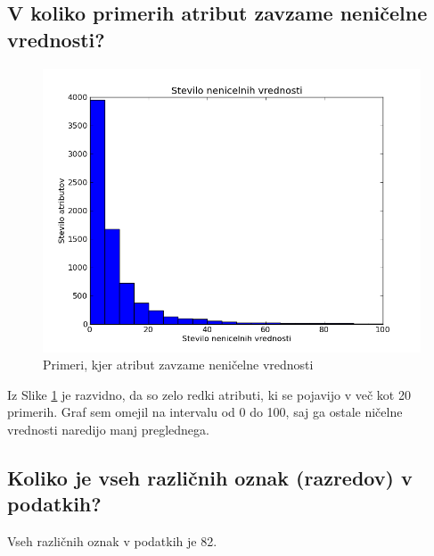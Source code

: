 \documentclass[a4paper,11pt]{article}
\begin{document}
\subsection*{V koliko primerih atribut zavzame neničelne vrednosti?}
\begin{figure}[H]
\begin{center}
\includegraphics[scale=0.5]{attributes.png}
\caption{Primeri, kjer atribut zavzame neničelne vrednosti}
\label{atributi}
\end{center}
\end{figure}
Iz Slike \ref{atributi} je razvidno, da so zelo redki atributi, ki se pojavijo v več kot 20 primerih. Graf sem omejil na intervalu od 0 do 100, saj ga ostale ničelne vrednosti naredijo manj preglednega.

\subsection*{Koliko je vseh različnih oznak (razredov) v podatkih?}
Vseh različnih oznak v podatkih je 82.
\end{document}
